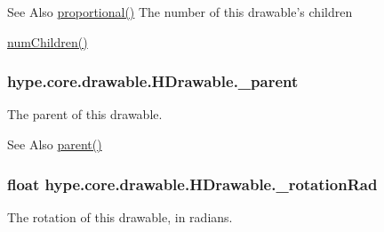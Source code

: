 \begin{DoxySeeAlso}{See Also}
\hyperlink{classhype_1_1core_1_1drawable_1_1_h_drawable_a220999f7d54e04a47ad0509d349a2bdd}{proportional()} The number of this drawable's children

\hyperlink{classhype_1_1core_1_1drawable_1_1_h_drawable_a85a4ab0860a8c22e7f66d3da99f06940}{num\-Children()} 
\end{DoxySeeAlso}
\hypertarget{classhype_1_1core_1_1drawable_1_1_h_drawable_ad612d5e1d96467275eeb8163b9da4b8f}{
\subsubsection[{\-\_\-parent}]{ hype.\-core.\-drawable.\-H\-Drawable.\-\_\-parent\hspace{0.3cm}{\ttfamily [protected]}}}\label{classhype_1_1core_1_1drawable_1_1_h_drawable_ad612d5e1d96467275eeb8163b9da4b8f}


The parent of this drawable. 

\begin{DoxySeeAlso}{See Also}
\hyperlink{classhype_1_1core_1_1drawable_1_1_h_drawable_ae3e39365ae4a4efd3c1540bd428a630c}{parent()} 
\end{DoxySeeAlso}
\hypertarget{classhype_1_1core_1_1drawable_1_1_h_drawable_a5489140987809e738b74139cfa0e7583}{
\subsubsection[{\-\_\-rotation\-Rad}]{\setlength{\rightskip}{0pt plus 5cm}float hype.\-core.\-drawable.\-H\-Drawable.\-\_\-rotation\-Rad\hspace{0.3cm}{\ttfamily [protected]}}}\label{classhype_1_1core_1_1drawable_1_1_h_drawable_a5489140987809e738b74139cfa0e7583}


The rotation of this drawable, in radians. 

